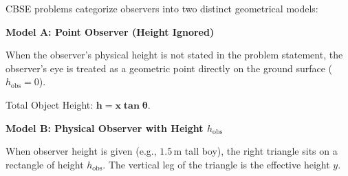 \documentclass[10pt,a4paper]{article}
\begin{document}
CBSE problems categorize observers into two distinct geometrical models:

\begin{center}
\noindent
\begin{minipage}[t]{0.485\textwidth}
  \begin{tcolorbox}[colback=bluepale,colframe=primary,boxrule=.6pt,arc=1.5mm,left=2mm,right=2mm,top=2mm,bottom=2mm]
    \centering\textbf{\color{navy}Model A: Point Observer (Height Ignored)}\par\vspace{1mm}
    \raggedright\scriptsize
    When the observer's physical height is not stated in the problem statement, the observer's eye is treated as a geometric point directly on the ground surface ($h_{\text{obs}} = 0$).
    \begin{center}
    \end{center}
    Total Object Height: $\mathbf{h = x\tan\theta}$.
  \end{tcolorbox}
\end{minipage}\hfill
\begin{minipage}[t]{0.485\textwidth}
  \begin{tcolorbox}[colback=goldpale,colframe=gold!70!black,boxrule=.6pt,arc=1.5mm,left=2mm,right=2mm,top=2mm,bottom=2mm]
    \centering\textbf{\color{navy}Model B: Physical Observer with Height $h_{\text{obs}}$}\par\vspace{1mm}
    \raggedright\scriptsize
    When observer height is given (e.g., $1.5\,\text{m}$ tall boy), the right triangle sits on a rectangle of height $h_{\text{obs}}$. The vertical leg of the triangle is the effective height $y$.
    \begin{center}
\end{center}
\end{tcolorbox}
\end{minipage}
\end{center}
\end{document}

